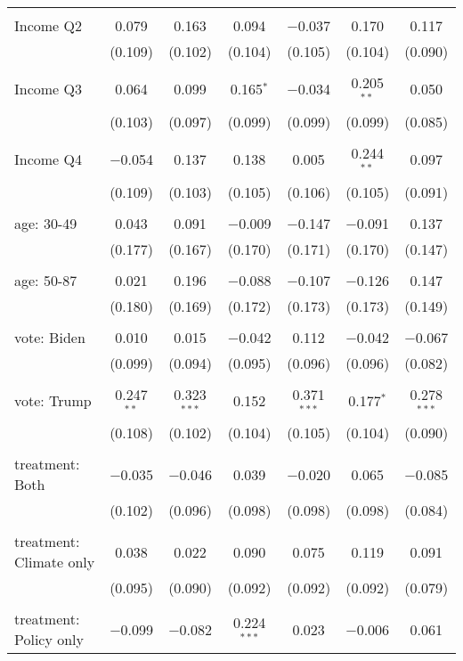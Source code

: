 \begin{tabular}{@{\extracolsep{5pt}}lcccccc}
  & & & & & & \\ 
 Income Q2 & 0.079 & 0.163 & 0.094 & $-$0.037 & 0.170 & 0.117 \\ 
  & (0.109) & (0.102) & (0.104) & (0.105) & (0.104) & (0.090) \\ 
  & & & & & & \\ 
 Income Q3 & 0.064 & 0.099 & 0.165$^{*}$ & $-$0.034 & 0.205$^{**}$ & 0.050 \\ 
  & (0.103) & (0.097) & (0.099) & (0.099) & (0.099) & (0.085) \\ 
  & & & & & & \\ 
 Income Q4 & $-$0.054 & 0.137 & 0.138 & 0.005 & 0.244$^{**}$ & 0.097 \\ 
  & (0.109) & (0.103) & (0.105) & (0.106) & (0.105) & (0.091) \\ 
  & & & & & & \\ 
 age: 30-49 & 0.043 & 0.091 & $-$0.009 & $-$0.147 & $-$0.091 & 0.137 \\ 
  & (0.177) & (0.167) & (0.170) & (0.171) & (0.170) & (0.147) \\ 
  & & & & & & \\ 
 age: 50-87 & 0.021 & 0.196 & $-$0.088 & $-$0.107 & $-$0.126 & 0.147 \\ 
  & (0.180) & (0.169) & (0.172) & (0.173) & (0.173) & (0.149) \\ 
  & & & & & & \\ 
 vote: Biden & 0.010 & 0.015 & $-$0.042 & 0.112 & $-$0.042 & $-$0.067 \\ 
  & (0.099) & (0.094) & (0.095) & (0.096) & (0.096) & (0.082) \\ 
  & & & & & & \\ 
 vote: Trump & 0.247$^{**}$ & 0.323$^{***}$ & 0.152 & 0.371$^{***}$ & 0.177$^{*}$ & 0.278$^{***}$ \\ 
  & (0.108) & (0.102) & (0.104) & (0.105) & (0.104) & (0.090) \\ 
  & & & & & & \\ 
 treatment: Both & $-$0.035 & $-$0.046 & 0.039 & $-$0.020 & 0.065 & $-$0.085 \\ 
  & (0.102) & (0.096) & (0.098) & (0.098) & (0.098) & (0.084) \\ 
  & & & & & & \\ 
 treatment: Climate only & 0.038 & 0.022 & 0.090 & 0.075 & 0.119 & 0.091 \\ 
  & (0.095) & (0.090) & (0.092) & (0.092) & (0.092) & (0.079) \\ 
  & & & & & & \\ 
 treatment: Policy only & $-$0.099 & $-$0.082 & 0.224$^{***}$ & 0.023 & $-$0.006 & 0.061 \\ 

\end{tabular}
